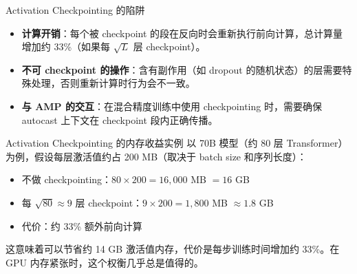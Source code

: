 \begin{warningbox}{Activation Checkpointing 的陷阱}
\begin{itemize}
    \item \textbf{计算开销}：每个被 checkpoint 的段在反向时会重新执行前向计算，总计算量增加约 33\%（如果每 $\sqrt{L}$ 层 checkpoint）。
    \item \textbf{不可 checkpoint 的操作}：含有副作用（如 dropout 的随机状态）的层需要特殊处理，否则重新计算时行为会不一致。
    \item \textbf{与 AMP 的交互}：在混合精度训练中使用 checkpointing 时，需要确保 autocast 上下文在 checkpoint 段内正确传播。
\end{itemize}
\end{warningbox}

\begin{knowledgebox}{Activation Checkpointing 的内存收益实例}
以 70B 模型（约 80 层 Transformer）为例，假设每层激活值约占 200 MB（取决于 batch size 和序列长度）：
\begin{itemize}
    \item 不做 checkpointing：$80 \times 200 = 16,000$ MB $= 16$ GB
    \item 每 $\sqrt{80} \approx 9$ 层 checkpoint：$9 \times 200 = 1,800$ MB $\approx 1.8$ GB
    \item 代价：约 33\% 额外前向计算
\end{itemize}
这意味着可以节省约 14 GB 激活值内存，代价是每步训练时间增加约 33\%。在 GPU 内存紧张时，这个权衡几乎总是值得的。
\end{knowledgebox}

